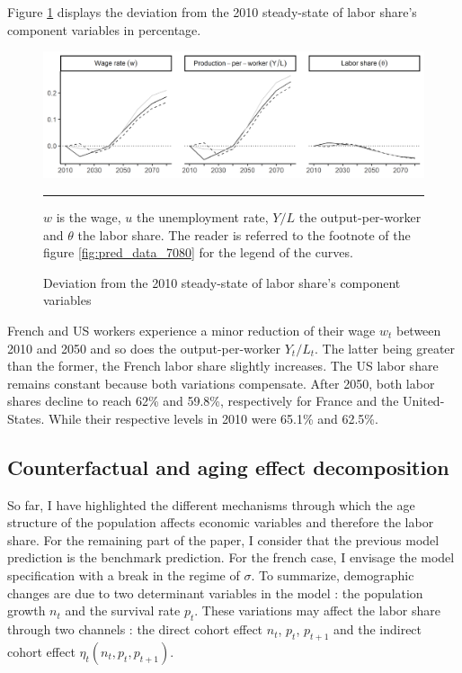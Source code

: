 Figure \ref{fig:dev_laborshare_1080} displays the deviation from the 2010 steady-state of labor share's component variables in percentage.
\begin{figure}[tb]
	\centering
	\includegraphics[width=1\linewidth]{../result/deviation/dev_laborshare1080.png}
	\caption{Deviation from the 2010 steady-state of labor share's component variables}
	\label{fig:dev_laborshare_1080}
	\vspace{.5ex}
	\hrule
	\vspace{-4ex}
	\justify\singlespacing\footnotesize $w$ is the wage, $u$ the unemployment rate, $Y/L$ the output-per-worker and $\theta$ the labor share. The reader is referred to the footnote of the figure \ref{fig:pred_data_7080} for the legend of the curves.
\end{figure}
French and US workers experience a minor reduction of their wage $w_t$ between 2010 and 2050 and so does the output-per-worker $Y_t/L_t$. The latter being greater than the former, the French labor share slightly increases. The US labor share remains constant because both variations compensate. After 2050, both labor shares decline to reach 62\% and 59.8\%, respectively for France and the United-States. While their respective levels in 2010 were 65.1\% and 62.5\%.

\subsection{Counterfactual and aging effect decomposition} \label{subsec:counterfactual}

So far, I have highlighted the different mechanisms through which the age structure of the population affects economic variables and therefore the labor share. For the remaining part of the paper, I consider that the previous model prediction is the benchmark prediction. For the french case, I envisage the model specification with a break in the regime of $\sigma$. To summarize, demographic changes are due to two determinant variables in the model : the population growth $n_t$ and the survival rate $p_t$. These variations may affect the labor share through two channels : the direct cohort effect $n_t$, $p_t$, $p_{t+1}$ and the indirect cohort effect $\eta_t(n_t, p_t, p_{t+1})$.

